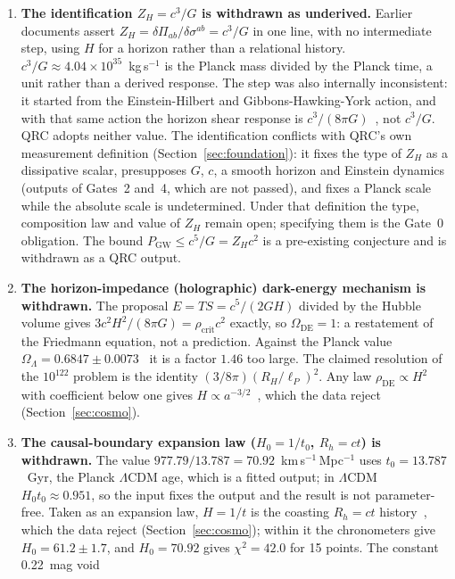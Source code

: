 \documentclass[11pt]{article}
\theoremstyle{definition}
\theoremstyle{remark}
\begin{document}
\begin{enumerate}
\item \textbf{The identification $Z_H=c^3/G$ is withdrawn as underived.} Earlier
  documents assert $Z_H=\delta\Pi_{ab}/\delta\sigma^{ab}=c^3/G$ in one line, with no
  intermediate step, using $H$ for a horizon rather than a relational history. $c^3/G\approx4.04\times10^{35}$~kg\,s$^{-1}$ is the
  Planck mass divided by the Planck time, a unit rather than a derived response. The
  step was also internally inconsistent: it started from the Einstein-Hilbert and
  Gibbons-Hawking-York action, and with that same action the horizon shear response is
  $c^3/(8\pi G)$~\cite{price1986,brown1993}, not $c^3/G$. QRC adopts neither value. The
  identification conflicts with QRC's own measurement definition
  (Section~\ref{sec:foundation}): it fixes the type of $Z_H$ as a dissipative scalar,
  presupposes $G$, $c$, a smooth horizon and Einstein dynamics (outputs of Gates~2
  and~4, which are not passed), and fixes a Planck scale while the absolute scale is
  undetermined. Under that definition the type, composition law and value of $Z_H$
  remain open; specifying them is the Gate~0 obligation. The bound
  $P_{\mathrm{GW}}\le c^5/G=Z_Hc^2$ is a pre-existing conjecture and is withdrawn as a
  QRC output.
\item \textbf{The horizon-impedance (holographic) dark-energy mechanism is withdrawn.}
  The proposal $E=TS=c^5/(2GH)$ divided by the Hubble volume gives
  $3c^2H^2/(8\pi G)=\rho_{\mathrm{crit}}c^2$ exactly, so $\Omega_{\mathrm{DE}}=1$: a
  restatement of the Friedmann equation, not a prediction. Against the Planck value
  $\Omega_\Lambda=0.6847\pm0.0073$~\cite{planck2018} it is a factor $1.46$ too large. The
  claimed resolution of the $10^{122}$ problem is the identity $(3/8\pi)(R_H/\ell_P)^2$.
  Any law $\rho_{\mathrm{DE}}\propto H^2$ with coefficient below one gives
  $H\propto a^{-3/2}$~\cite{hsu2004}, which the data reject (Section~\ref{sec:cosmo}).
\item \textbf{The causal-boundary expansion law ($H_0=1/t_0$, $R_h=ct$) is withdrawn.}
  The value $977.79/13.787=70.92$~km\,s$^{-1}$\,Mpc$^{-1}$ uses $t_0=13.787$~Gyr, the
  Planck $\Lambda$CDM age, which is a fitted output; in $\Lambda$CDM $H_0t_0\approx0.951$,
  so the input fixes the output and the result is not parameter-free. Taken as an
  expansion law, $H=1/t$ is the coasting $R_h=ct$ history~\cite{melia2012}, which the data
  reject (Section~\ref{sec:cosmo}); within it the chronometers give $H_0=61.2\pm1.7$, and
  $H_0=70.92$ gives $\chi^2=42.0$ for 15 points. The constant 0.22~mag void

\end{enumerate}
\end{document}
